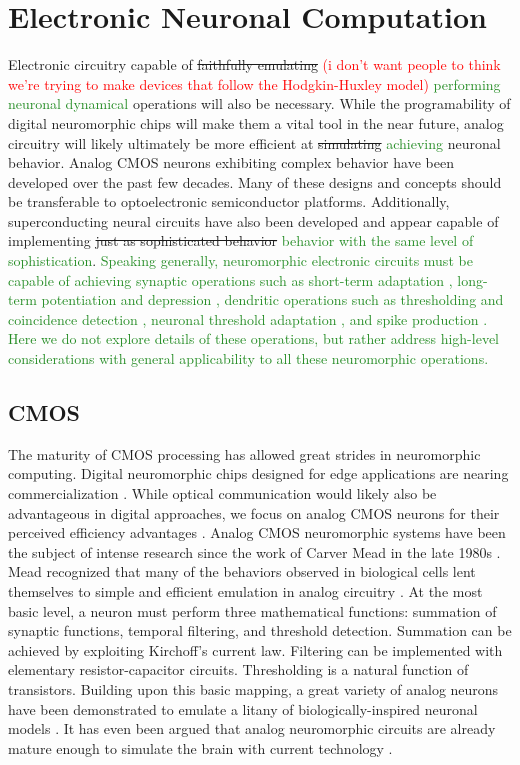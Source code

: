 \documentclass[twocolumn]{article}
\begin{document}
\section{\label{sec:soma}Electronic Neuronal Computation}
Electronic circuitry capable of \sout{faithfully emulating} \textcolor{red}{(i don't want people to think we're trying to make devices that follow the Hodgkin-Huxley model)} \textcolor{ForestGreen}{performing neuronal dynamical} operations will also be necessary. While the programability of digital neuromorphic chips will make them a vital tool in the near future, analog circuitry will likely ultimately be more efficient at \sout{simulating} \textcolor{ForestGreen}{achieving} neuronal behavior. Analog CMOS neurons exhibiting complex behavior have been developed over the past few decades. Many of these designs and concepts should be transferable to optoelectronic semiconductor platforms. Additionally, superconducting neural circuits have also been developed and appear capable of implementing \sout{just as sophisticated behavior} \textcolor{ForestGreen}{behavior with the same level of sophistication}. \textcolor{ForestGreen}{Speaking generally, neuromorphic electronic circuits must be capable of achieving synaptic operations such as short-term adaptation \cite{}, long-term potentiation and depression \cite{}, dendritic operations such as thresholding and coincidence detection \cite{}, neuronal threshold adaptation \cite{}, and spike production \cite{}. Here we do not explore details of these operations, but rather address high-level considerations with general applicability to all these neuromorphic operations.}

\subsection{CMOS}
The maturity of CMOS processing has allowed great strides in neuromorphic computing. Digital neuromorphic chips designed for edge applications are nearing commercialization \cite{davies2018loihi, merolla2014million}. While optical communication would likely also be advantageous in digital approaches, we focus on analog CMOS neurons for their perceived efficiency advantages \cite{rajendran2012specifications, mead1990neuromorphic}. Analog CMOS neuromorphic systems have been the subject of intense research since the work of Carver Mead in the late 1980s \cite{1,2}. Mead recognized that many of the behaviors observed in biological cells lent themselves to simple and efficient emulation in analog circuitry \cite{mead1990neuromorphic}. At the most basic level, a neuron must perform three mathematical functions: summation of synaptic functions, temporal filtering, and threshold detection. Summation can be achieved by exploiting Kirchoff's current law. Filtering can be implemented with elementary resistor-capacitor circuits. Thresholding is a natural function of transistors. Building upon this basic mapping, a great variety of analog neurons have been demonstrated to emulate a litany of biologically-inspired neuronal models \cite{indiveri2011neuromorphic,more,more}. It has even been argued that analog neuromorphic circuits are already mature enough to simulate the brain with current technology \cite{hasler2017special}.
\end{document}
